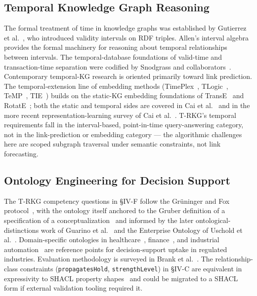\documentclass{ieeeaccess}
\begin{document}
\subsection{Temporal Knowledge Graph Reasoning}

The formal treatment of time in knowledge graphs was established by Gutierrez et al.~\cite{gutierrez2007}, who introduced validity intervals on RDF triples. Allen's interval algebra~\cite{allen1983} provides the formal machinery for reasoning about temporal relationships between intervals. The temporal-database foundations of valid-time and transaction-time separation were codified by Snodgrass and collaborators~\cite{snodgrass1995,jensen1997}. Contemporary temporal-KG research is oriented primarily toward link prediction. The temporal-extension line of embedding methods (TimePlex~\cite{timeplex}, TLogic~\cite{tlogic}, TeMP~\cite{temp}, TIE~\cite{tie}) builds on the static-KG embedding foundations of TransE~\cite{transe} and RotatE~\cite{rotate}; both the static and temporal sides are covered in Cai et al.~\cite{cai2023} and in the more recent representation-learning survey of Cai et al.~\cite{cai2024tkgsurvey}. T-RKG's temporal requirements fall in the interval-based, point-in-time query-answering category, not in the link-prediction or embedding category — the algorithmic challenges here are scoped subgraph traversal under semantic constraints, not link forecasting.

\subsection{Ontology Engineering for Decision Support}

The T-RKG competency questions in §IV-F follow the Gr\"{u}ninger and Fox protocol~\cite{gruninger1995}, with the ontology itself anchored to the Gruber definition of a specification of a conceptualization~\cite{gruber1995} and informed by the later ontological-distinctions work of Guarino et al.~\cite{guarino2009} and the Enterprise Ontology of Uschold et al.~\cite{uschold1998}. Domain-specific ontologies in healthcare~\cite{schriml2019}, finance~\cite{fibo}, and industrial automation~\cite{ringsquandl2015} are reference points for decision-support uptake in regulated industries. Evaluation methodology is surveyed in Brank et al.~\cite{brank2005}. The relationship-class constraints (\texttt{propagatesHold}, \texttt{strengthLevel}) in §IV-C are equivalent in expressivity to SHACL property shapes~\cite{shacl} and could be migrated to a SHACL form if external validation tooling required it.
\end{document}

